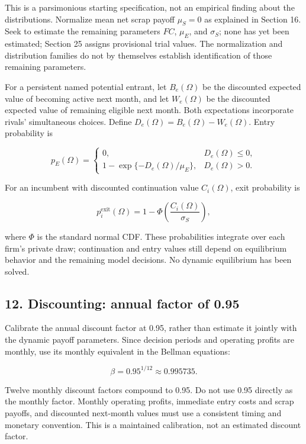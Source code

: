 \documentclass[10pt,]{article}
\begin{document}
This is a parsimonious starting specification, not an empirical finding
about the distributions. Normalize mean net scrap payoff \(\mu_S=0\) as
explained in Section 16. Seek to estimate the remaining parameters
\(FC\), \(\mu_E\), and \(\sigma_S\); none has yet been estimated;
Section 25 assigns provisional trial values. The normalization and
distribution families do not by themselves establish identification of
those remaining parameters.

For a persistent named potential entrant, let \(B_e(\Omega)\) be the
discounted expected value of becoming active next month, and let
\(W_e(\Omega)\) be the discounted expected value of remaining eligible
next month. Both expectations incorporate rivals' simultaneous choices.
Define \(D_e(\Omega)=B_e(\Omega)-W_e(\Omega)\). Entry probability is

\[
p_E(\Omega)=
\begin{cases}
0,&D_e(\Omega)\leq0,\\
1-\exp\{-D_e(\Omega)/\mu_E\},&D_e(\Omega)>0.
\end{cases}
\]

For an incumbent with discounted continuation value \(C_i(\Omega)\),
exit probability is

\[
p_i^{\mathrm{exit}}(\Omega)
=1-\Phi\!\left(\frac{C_i(\Omega)}{\sigma_S}\right),
\]

where \(\Phi\) is the standard normal CDF. These probabilities integrate
over each firm's private draw; continuation and entry values still
depend on equilibrium behavior and the remaining model decisions. No
dynamic equilibrium has been solved.

\subsection{12. Discounting: annual factor of
0.95}\label{discounting-annual-factor-of-0.95}

Calibrate the annual discount factor at 0.95, rather than estimate it
jointly with the dynamic payoff parameters. Since decision periods and
operating profits are monthly, use its monthly equivalent in the Bellman
equations:

\[
\beta=0.95^{1/12}\approx 0.995735.
\]

Twelve monthly discount factors compound to 0.95. Do not use 0.95
directly as the monthly factor. Monthly operating profits, immediate
entry costs and scrap payoffs, and discounted next-month values must use
a consistent timing and monetary convention. This is a maintained
calibration, not an estimated discount factor.
\end{document}
